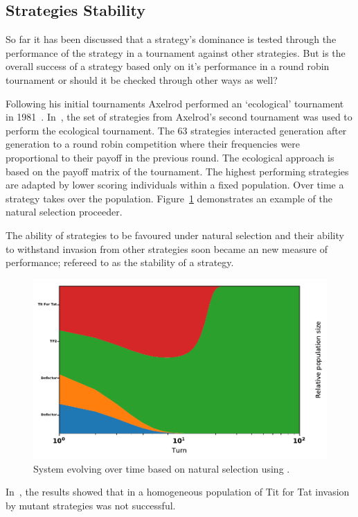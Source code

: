 \documentclass{article}
\begin{document}
\subsection{Strategies Stability}

So far it has been discussed that a strategy's dominance is tested through
the performance of the strategy in a tournament against other strategies.
But is the overall success of a strategy based only on it's performance in a 
round robin tournament or should it be checked through other ways as well?

Following his initial tournaments Axelrod performed an `ecological' tournament
in 1981~\cite{Axelrod1981}. In~\cite{Axelrod1981}, the set of strategies from 
Axelrod's second tournament was used to perform the ecological tournament. The 
63 strategies interacted generation after generation to a round robin competition
where their frequencies were proportional to their payoff in the previous round.
The ecological approach is based on the payoff matrix of the tournament. The
highest performing strategies are adapted by lower scoring individuals
within a fixed population. Over time a strategy takes over the population.
Figure~\ref{fig:ecological.tournament} demonstrates an example of the
natural selection proceeder.

The ability of strategies to be favoured under natural selection and their 
ability to withstand invasion from other strategies soon became an new measure 
of performance; refereed to as the stability of a strategy.

\begin{figure}[!hbtp]
    \centering
    \includegraphics[width=.6\textwidth]{./assets/images/ecological.pdf}
    \caption{System evolving over time based on natural selection using
    \cite{axelrodproject}.}
    \label{fig:ecological.tournament}
\end{figure}

In~\cite{Axelrod1981}, the results showed that in a homogeneous
population of Tit for Tat invasion by mutant strategies was not successful.
\end{document}
